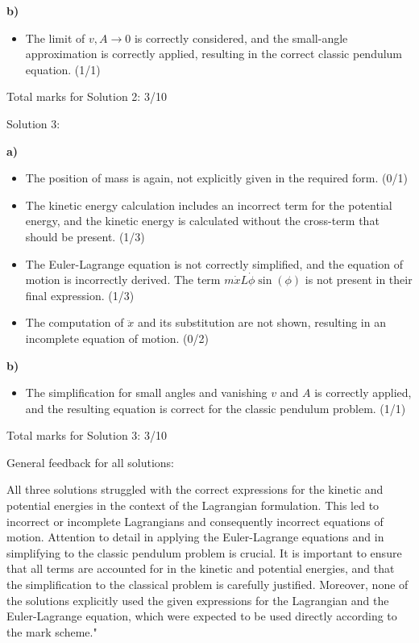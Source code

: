 \documentclass[a4paper,11pt]{article}
\begin{document}
\textbf{b)}
\begin{itemize}
    \item The limit of \( v, A \rightarrow 0 \) is correctly considered, and the small-angle approximation is correctly applied, resulting in the correct classic pendulum equation. (1/1)
\end{itemize}

Total marks for Solution 2: 3/10

Solution 3:

\textbf{a)}
\begin{itemize}
    \item The position of mass is again, not explicitly given in the required form. (0/1)
    \item The kinetic energy calculation includes an incorrect term for the potential energy, and the kinetic energy is calculated without the cross-term that should be present. (1/3)
    \item The Euler-Lagrange equation is not correctly simplified, and the equation of motion is incorrectly derived. The term \( m\dot{x}L\dot{\phi}\sin(\phi) \) is not present in their final expression. (1/3)
    \item The computation of \( \ddot{x} \) and its substitution are not shown, resulting in an incomplete equation of motion. (0/2)
\end{itemize}

\textbf{b)}
\begin{itemize}
    \item The simplification for small angles and vanishing \( v \) and \( A \) is correctly applied, and the resulting equation is correct for the classic pendulum problem. (1/1)
\end{itemize}

Total marks for Solution 3: 3/10

General feedback for all solutions:

All three solutions struggled with the correct expressions for the kinetic and potential energies in the context of the Lagrangian formulation. This led to incorrect or incomplete Lagrangians and consequently incorrect equations of motion. Attention to detail in applying the Euler-Lagrange equations and in simplifying to the classic pendulum problem is crucial. It is important to ensure that all terms are accounted for in the kinetic and potential energies, and that the simplification to the classical problem is carefully justified. Moreover, none of the solutions explicitly used the given expressions for the Lagrangian and the Euler-Lagrange equation, which were expected to be used directly according to the mark scheme."
\end{document}
